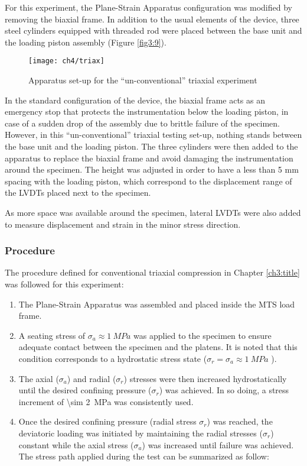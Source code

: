 For this experiment, the Plane-Strain Apparatus configuration was modified by removing the biaxial frame. In addition to the usual elements of the device, three steel cylinders equipped with threaded rod were placed between the base unit and the loading piston assembly (Figure \ref{fig3:9}). 

\begin{figure}[tb]
    \centering
    \texttt{[image: ch4/triax]}
    \caption{Apparatus set-up for the “un-conventional” triaxial experiment}
    \label{fig4:9}
\end{figure} 

In the standard configuration of the device, the biaxial frame acts as an emergency stop that protects the instrumentation below the loading piston, in case of a sudden drop of the assembly due to brittle failure of the specimen. However, in this “un-conventional” triaxial testing set-up, nothing stands between the base unit and the loading piston. The three cylinders were then added to the apparatus to replace the biaxial frame and avoid damaging the instrumentation around the specimen. The height was adjusted in order to have a less than 5 \si{\milli\meter} spacing with the loading piston, which correspond to the displacement range of the LVDTs placed next to the specimen. 

As more space was available around the specimen, lateral LVDTs were also added to measure displacement and strain in the minor stress direction. 

\subsubsection{Procedure}

The procedure defined for conventional triaxial compression in Chapter \ref{ch3:title} was followed for this experiment:  

\begin{enumerate}
    \item The Plane-Strain Apparatus was assembled and placed inside the MTS load frame.

    \item  A seating stress of $\sigma_a \approx \SI{1}{MPa}$ was applied to the specimen to ensure adequate contact between the specimen and the platens. It is noted that this condition corresponds to a hydrostatic stress state ($\sigma_r = \sigma_a \approx \SI{1}{MPa}$ ).

    \item  The axial ($\sigma_a$) and radial ($\sigma_r$) stresses were then increased hydrostatically until the desired confining pressure ($\sigma_r$) was achieved. In so doing, a stress increment of \SI{\sim 2}{MPa} was consistently used.

    \item  Once the desired confining pressure (radial stress $\sigma_r$) was reached, the deviatoric loading was initiated by maintaining the radial stresses ($\sigma_r$) constant while the axial stress ($\sigma_a$) was increased until failure was achieved. The stress path applied during the test can be summarized as follow:
\end{enumerate}

